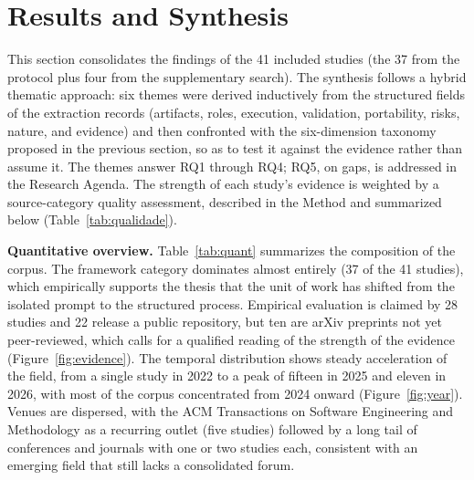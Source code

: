 \section{Results and Synthesis}

This section consolidates the findings of the 41 included studies (the 37 from the protocol plus four from the supplementary search). The synthesis follows a hybrid thematic approach: six themes were derived inductively from the structured fields of the extraction records (artifacts, roles, execution, validation, portability, risks, nature, and evidence) and then confronted with the six-dimension taxonomy proposed in the previous section, so as to test it against the evidence rather than assume it. The themes answer RQ1 through RQ4; RQ5, on gaps, is addressed in the Research Agenda. The strength of each study's evidence is weighted by a source-category quality assessment, described in the Method and summarized below (Table~\ref{tab:qualidade}).

\noindent\textbf{Quantitative overview.} Table~\ref{tab:quant} summarizes the composition of the corpus. The framework category dominates almost entirely (37 of the 41 studies), which empirically supports the thesis that the unit of work has shifted from the isolated prompt to the structured process. Empirical evaluation is claimed by 28 studies and 22 release a public repository, but ten are arXiv preprints not yet peer-reviewed, which calls for a qualified reading of the strength of the evidence (Figure~\ref{fig:evidence}). The temporal distribution shows steady acceleration of the field, from a single study in 2022 to a peak of fifteen in 2025 and eleven in 2026, with most of the corpus concentrated from 2024 onward (Figure~\ref{fig:year}). Venues are dispersed, with the ACM Transactions on Software Engineering and Methodology as a recurring outlet (five studies) followed by a long tail of conferences and journals with one or two studies each, consistent with an emerging field that still lacks a consolidated forum.

